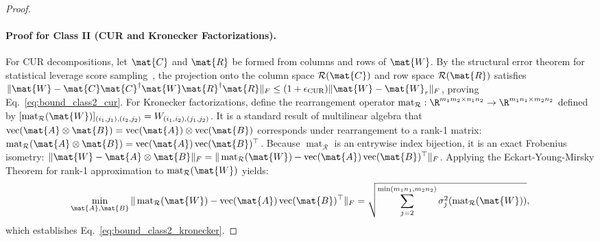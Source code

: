 \begin{proof}
\paragraph{Proof for Class II (CUR and Kronecker Factorizations).}
For CUR decompositions, let $\mat{C}$ and $\mat{R}$ be formed from columns and rows of $\mat{W}$. By the structural error theorem for statistical leverage score sampling~\cite{golub2013matrix}, the projection onto the column space $\mathcal{R}(\mat{C})$ and row space $\mathcal{R}(\mat{R})$ satisfies $\|\mat{W} - \mat{C} \mat{C}^\dagger \mat{W} \mat{R}^\dagger \mat{R}\|_F \le (1 + \epsilon_{\text{CUR}}) \|\mat{W} - \mat{W}_r\|_F$, proving Eq.~\eqref{eq:bound_class2_cur}.
For Kronecker factorizations, define the rearrangement operator $\operatorname{mat}_{\mathcal{R}}: \R^{m_1 m_2 \times n_1 n_2} \to \R^{m_1 n_1 \times m_2 n_2}$ defined by $[\operatorname{mat}_{\mathcal{R}}(\mat{W})]_{(i_1, j_1), (i_2, j_2)} = W_{(i_1, i_2), (j_1, j_2)}$. It is a standard result of multilinear algebra that $\operatorname{vec}(\mat{A} \otimes \mat{B}) = \operatorname{vec}(\mat{A}) \otimes \operatorname{vec}(\mat{B})$ corresponds under rearrangement to a rank-1 matrix: $\operatorname{mat}_{\mathcal{R}}(\mat{A} \otimes \mat{B}) = \operatorname{vec}(\mat{A}) \operatorname{vec}(\mat{B})^\top$.
Because $\operatorname{mat}_{\mathcal{R}}$ is an entrywise index bijection, it is an exact Frobenius isometry: $\|\mat{W} - \mat{A} \otimes \mat{B}\|_F = \|\operatorname{mat}_{\mathcal{R}}(\mat{W}) - \operatorname{vec}(\mat{A}) \operatorname{vec}(\mat{B})^\top\|_F$. Applying the Eckart-Young-Mirsky Theorem for rank-1 approximation to $\operatorname{mat}_{\mathcal{R}}(\mat{W})$ yields:
\begin{equation}
\min_{\mat{A}, \mat{B}} \|\operatorname{mat}_{\mathcal{R}}(\mat{W}) - \operatorname{vec}(\mat{A}) \operatorname{vec}(\mat{B})^\top\|_F = \sqrt{\sum_{j=2}^{\min(m_1 n_1, m_2 n_2)} \sigma_j^2(\operatorname{mat}_{\mathcal{R}}(\mat{W}))},
\end{equation}
which establishes Eq.~\eqref{eq:bound_class2_kronecker}.


\end{proof}
